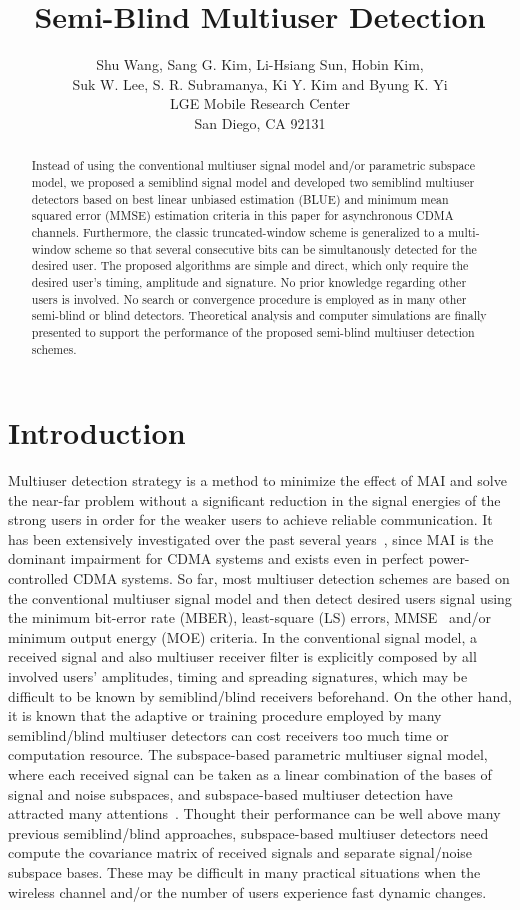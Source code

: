 \documentclass[a4paper,10pt,fleqn, twocolumn]{IEEETran}
\title{ Semi-Blind Multiuser Detection }
\date{}
\author{Shu Wang, Sang G. Kim, Li-Hsiang Sun, Hobin Kim,\\
   Suk W. Lee, S. R. Subramanya, Ki Y. Kim and Byung K. Yi\\LGE Mobile Research Center\\San Diego, CA 92131}
\begin{document}
\maketitle

\begin{abstract}
Instead of using the conventional multiuser signal model and/or
parametric subspace model, we proposed a semiblind signal model
and developed two semiblind multiuser detectors based on best
linear unbiased estimation (BLUE) and minimum mean squared error
(MMSE) estimation criteria in this paper for asynchronous CDMA
channels. Furthermore, the classic truncated-window scheme is
generalized to a multi-window scheme so that several consecutive
bits can be simultanously detected for the desired user. The
proposed algorithms are simple and direct, which only require the
desired user's timing, amplitude and signature. No prior knowledge
regarding other users is involved. No search or convergence
procedure is employed as in many other semi-blind or blind
detectors. Theoretical analysis and computer simulations are
finally presented to support the performance of the proposed
semi-blind multiuser detection schemes.
\end{abstract}

\section{Introduction}
Multiuser detection strategy is a method to minimize the effect of
MAI and solve the near-far problem without a significant reduction
in the signal energies of the strong users in order for the weaker
users to achieve reliable communication. It has been extensively
investigated over the past several years~\cite{Verd98}, since MAI
is the dominant impairment for CDMA systems and exists even in
perfect power-controlled CDMA systems. So far, most multiuser
detection schemes are based on the conventional multiuser signal
model and then detect desired users signal using the minimum
bit-error rate (MBER), least-square (LS) errors,
MMSE~\cite{Lupa89} and/or minimum output energy (MOE) criteria. In
the conventional signal model, a received signal and also
multiuser receiver filter is explicitly composed by all involved
users' amplitudes, timing and spreading signatures, which may be
difficult to be known by semiblind/blind receivers beforehand. On
the other hand, it is known that the adaptive or training
procedure employed by many semiblind/blind multiuser detectors can
cost receivers too much time or computation resource. The
subspace-based parametric multiuser signal model, where each
received signal can be taken as a linear combination of the bases
of signal and noise subspaces, and subspace-based multiuser
detection have attracted many attentions~\cite{Wang98}. Thought
their performance can be well above many previous semiblind/blind
approaches, subspace-based multiuser detectors need compute the
covariance matrix of received signals and separate signal/noise
subspace bases. These may be difficult in many practical
situations when the wireless channel and/or the number of users
experience fast dynamic changes.
\end{document}
